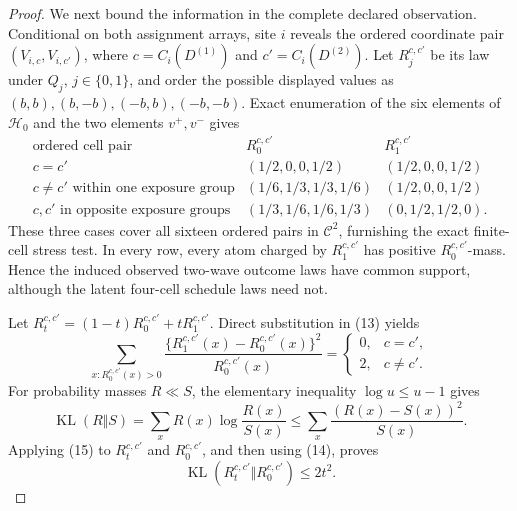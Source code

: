 \documentclass{article}
\begin{document}
\begin{proof}
We next bound the information in the complete declared observation.  Conditional on both assignment arrays, site \(i\) reveals the ordered coordinate pair \((V_{i,c},V_{i,c'})\), where \(c=C_i(D^{(1)})\) and \(c'=C_i(D^{(2)})\).  Let \(R_j^{c,c'}\) be its law under \(Q_j\), \(j\in\{0,1\}\), and order the possible displayed values as \((b,b),(b,-b),(-b,b),(-b,-b)\).  Exact enumeration of the six elements of \(\mathcal H_0\) and the two elements \(v^+,v^-\) gives
\[
\begin{array}{c|c|c}
\text{ordered cell pair}&R_0^{c,c'}&R_1^{c,c'}\\ \hline
c=c'&(1/2,0,0,1/2)&(1/2,0,0,1/2)\\
c\ne c'\text{ within one exposure group}
 &(1/6,1/3,1/3,1/6)&(1/2,0,0,1/2)\\
c,c'\text{ in opposite exposure groups}
 &(1/3,1/6,1/6,1/3)&(0,1/2,1/2,0).
\end{array} \tag{13}
\]
These three cases cover all sixteen ordered pairs in \(\mathcal C^2\), furnishing the exact finite-cell stress test.  In every row, every atom charged by \(R_1^{c,c'}\) has positive \(R_0^{c,c'}\)-mass.  Hence the induced observed two-wave outcome laws have common support, although the latent four-cell schedule laws need not.

Let \(R_t^{c,c'}=(1-t)R_0^{c,c'}+tR_1^{c,c'}\).  Direct substitution in (13) yields
\[
 \sum_{x:R_0^{c,c'}(x)>0}
 \frac{\{R_1^{c,c'}(x)-R_0^{c,c'}(x)\}^2}
      {R_0^{c,c'}(x)}
 =\begin{cases}
   0,&c=c',\\
   2,&c\ne c'.
  \end{cases} \tag{14}
\]
For probability masses \(R\ll S\), the elementary inequality \(\log u\le u-1\) gives
\[
 \operatorname{KL}(R\Vert S)
 =\sum_xR(x)\log\frac{R(x)}{S(x)}
 \le\sum_x\frac{(R(x)-S(x))^2}{S(x)}. \tag{15}
\]
Applying (15) to \(R_t^{c,c'}\) and \(R_0^{c,c'}\), and then using (14), proves
\[
 \operatorname{KL}(R_t^{c,c'}\Vert R_0^{c,c'})\le2t^2. \tag{16}
\]


\end{proof}
\end{document}
